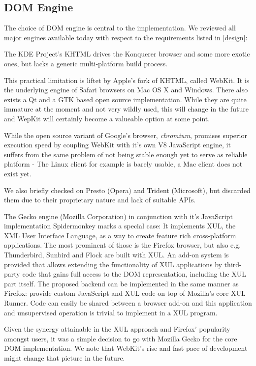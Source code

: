 \subsection{DOM Engine\label{dom}}

The choice of DOM engine is central to the implementation.
We reviewed all major engines available today with respect to the requirements listed in \ref{design}:

The KDE Project's KHTML drives the Konquerer browser and some more exotic ones, but lacks a generic multi-platform build process.

This practical limitation is liftet by Apple's fork of KHTML, called WebKit.
It is the underlying engine of Safari browsers on Mac OS X and Windows. %
There also exists a Qt and a GTK based open source implementation.
While they are quite immature at the moment and not very wildly used, this will change in the future and WepKit will certainly become a valueable option at some point.

While the open source variant of Google's browser, \textit{chromium}, promises superior execution speed by coupling WebKit with it's own V8 JavaScript engine, it suffers from the same problem of not being stable enough yet to serve as reliable platform -
The Linux client for example is barely usable, a Mac client does not exist yet.

We also briefly checked on Presto (Opera) and Trident (Microsoft), but discarded them due to their proprietary nature and lack of suitable APIs.

The Gecko engine (Mozilla Corporation) in conjunction with it's JavaScript implementation Spidermonkey marks a special case:
It implements XUL, the XML User Interface Language, as a way to create feature rich cross-platform applications.
The most prominent of those is the Firefox browser, but also e.g. Thunderbird, Sunbird and Flock are built with XUL.
An add-on system is provided that allows extending the functionality of XUL applications by third-party code that gains full access to the DOM representation, including the XUL part itself.
The proposed {\KrdWrd} backend can be implemented in the same manner as Firefox: provide custom JavaScript and XUL code on top of Mozilla's core XUL Runner. 
Code can easily be shared between a browser add-on and this application and unsupervised operation is trivial to implement in a XUL program.

Given the synergy attainable in the XUL approach and Firefox' popularity amongst users, it was a simple decision to go with Mozilla Gecko for the core DOM implementation.
We note that WebKit's rise and fast pace of development might change that picture in the future.

